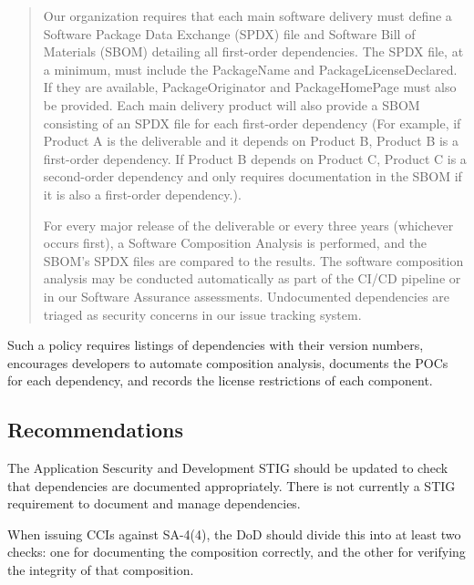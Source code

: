 \begin{quote}
Our organization requires that each main software delivery must define a Software Package Data Exchange (SPDX) file and Software Bill of Materials (SBOM) detailing all first-order dependencies.\autocite{20210628:wheeler2019} The SPDX file, at a minimum, must include the PackageName and PackageLicenseDeclared. If they are available, PackageOriginator and PackageHomePage must also be provided. Each main delivery product will also provide a SBOM consisting of an SPDX file for each first-order dependency (For example, if Product A is the deliverable and it depends on Product B, Product B is a first-order dependency. If Product B depends on Product C, Product C is a second-order dependency and only requires documentation in the SBOM if it is also a first-order dependency.).

For every major release of the deliverable or every three years (whichever occurs first), a Software Composition Analysis is performed, and the SBOM's SPDX files are compared to the results. The software composition analysis may be conducted automatically as part of the CI/CD pipeline or in our Software Assurance assessments. Undocumented dependencies are triaged as security concerns in our issue tracking system.
\end{quote}

Such a policy requires listings of dependencies with their version numbers, encourages developers to automate composition analysis, documents the POCs for each dependency, and records the license restrictions of each component.

\subsection{Recommendations}

The Application Sescurity and Development STIG should be updated to check that dependencies are documented appropriately. There is not currently a STIG requirement to document and manage dependencies.

When issuing CCIs against SA-4(4), the DoD should divide this into at least two checks: one for documenting the composition correctly, and the other for verifying the integrity of that composition.
